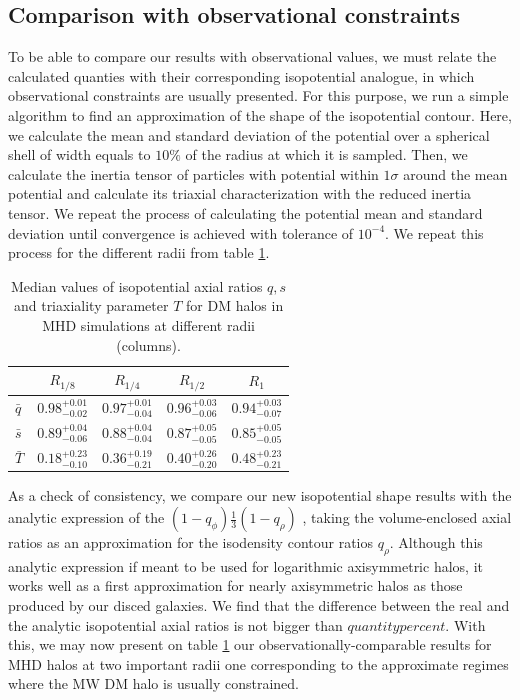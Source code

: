 \documentclass[a4paper,fleqn,usenatbib]{mnras}
\begin{document}
\subsection{Comparison with observational constraints}
To be able to compare our results with observational values, we must relate the calculated quanties with their corresponding isopotential analogue, in which observational constraints are usually presented. For this purpose, we run a simple algorithm to find an approximation of the shape of the isopotential contour. Here, we calculate the mean and standard deviation of the potential over a spherical shell of width equals to $10\%$ of the radius at which it is sampled. Then, we calculate the inertia tensor of particles with potential within $1\sigma$ around the mean potential and calculate its triaxial characterization with the reduced inertia tensor. We repeat the process of calculating the potential mean and standard deviation until convergence is achieved with tolerance of $10^{-4}$. We repeat this process for the different radii from table \ref{tabe:isopotential}. \\

\begin{table}
\setlength{\tabcolsep}{3pt}
\begin{tabular}{l|cccc}
 & $R_{1/8}$& $R_{1/4}$& $R_{1/2}$& $R_1$ \\
\hline \hline
$\bar{q}$&$0.98^{+0.01}_{-0.02}$&$0.97^{+0.01}_{-0.04}$&$0.96^{+0.03}_{-0.06}$&$0.94^{+0.03}_{-0.07}$ \\[0.1cm]
$\bar{s}$&$0.89^{+0.04}_{-0.06}$&$0.88^{+0.04}_{-0.04}$&$0.87^{+0.05}_{-0.05}$&$0.85^{+0.05}_{-0.05}$ \\[0.1cm]
$\bar{T}$&$0.18^{+0.23}_{-0.10}$&$0.36^{+0.19}_{-0.21}$&$0.40^{+0.26}_{-0.20}$&$0.48^{+0.23}_{-0.21}$ \\[0.1cm]
\hline
\end{tabular}
\caption{Median values of isopotential axial ratios $q,s$ and triaxiality parameter $T$ for DM halos in MHD simulations at different radii (columns). }
\label{tabe:isopotential}
\end{table}

As a check of consistency, we compare our new isopotential shape
results with the analytic expression of the
$(1-q_{\phi})\frac{1}{3}(1-q_{\rho})$ \citep{Binney_and_Tremaine_2008}, taking the volume-enclosed axial ratios
as an approximation for the isodensity contour ratios
$q_{\rho}$. Although this analytic expression if meant to be used for
logarithmic axisymmetric halos, it works well as a first approximation
for nearly axisymmetric halos as those produced by our disced
galaxies. We find that the difference between the real and the
analytic isopotential axial ratios is not bigger than $quantity
percent$. With this, we may now present on table
\ref{tabe:isopotential} our observationally-comparable results for MHD
halos at two important radii one corresponding to the approximate
regimes where the MW DM halo is usually constrained. 
\end{document}
